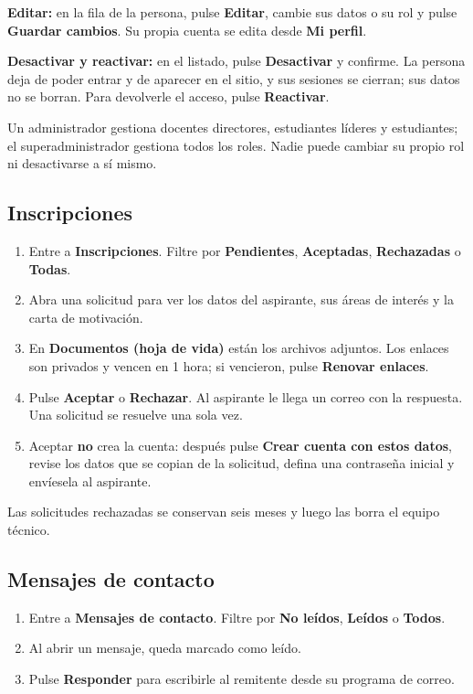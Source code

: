 \documentclass[11pt,a4paper]{article}
\newcommand{\boton}[1]{\textbf{\textcolor{siiisazul}{#1}}}
\begin{document}
\textbf{Editar:} en la fila de la persona, pulse \boton{Editar}, cambie sus datos o su rol y pulse
\boton{Guardar cambios}. Su propia cuenta se edita desde \boton{Mi perfil}.

\textbf{Desactivar y reactivar:} en el listado, pulse \boton{Desactivar} y confirme. La persona deja de poder entrar y
de aparecer en el sitio, y sus sesiones se cierran; sus datos no se borran. Para devolverle el acceso, pulse
\boton{Reactivar}.

Un administrador gestiona docentes directores, estudiantes l\'ideres y estudiantes; el superadministrador gestiona
todos los roles. Nadie puede cambiar su propio rol ni desactivarse a s\'i mismo.


\subsection{Inscripciones}
\begin{enumerate}
  \item Entre a \boton{Inscripciones}. Filtre por \boton{Pendientes}, \boton{Aceptadas}, \boton{Rechazadas} o
    \boton{Todas}.
  \item Abra una solicitud para ver los datos del aspirante, sus \'areas de inter\'es y la carta de motivaci\'on.
  \item En \boton{Documentos (hoja de vida)} est\'an los archivos adjuntos. Los enlaces son privados y vencen en 1 hora;
    si vencieron, pulse \boton{Renovar enlaces}.
  \item Pulse \boton{Aceptar} o \boton{Rechazar}. Al aspirante le llega un correo con la respuesta. Una solicitud se
    resuelve una sola vez.
  \item Aceptar \textbf{no} crea la cuenta: despu\'es pulse \boton{Crear cuenta con estos datos}, revise los datos que
    se copian de la solicitud, defina una contrase\~na inicial y env\'iesela al aspirante.
\end{enumerate}
Las solicitudes rechazadas se conservan seis meses y luego las borra el equipo t\'ecnico.


\subsection{Mensajes de contacto}
\begin{enumerate}
  \item Entre a \boton{Mensajes de contacto}. Filtre por \boton{No le\'idos}, \boton{Le\'idos} o \boton{Todos}.
  \item Al abrir un mensaje, queda marcado como le\'ido.
  \item Pulse \boton{Responder} para escribirle al remitente desde su programa de correo.
\end{enumerate}
\end{document}
